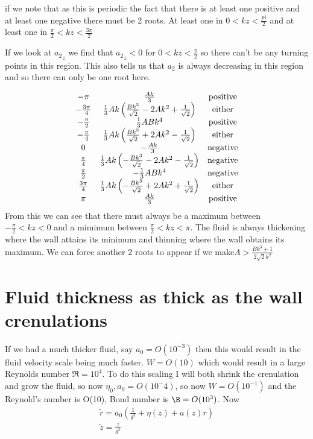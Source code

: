 \documentclass[12pt]{article}
\begin{document}
if we note that as this is periodic the fact that there is at least one positive and at least one negative there must be 2 roots. At least one in $0<kz<\frac{pi}{2}$ and at least one in $ \frac{\pi}{2}<kz<\frac{3\pi}{2}$

If we look at ${a_2}_z$ we find that ${a_2}_z<0 $ for $0<kz<\frac{\pi}{2}$ so there can't be any turning points in this region. This also tells us that $a_2$ is always decreasing in this region and so there can only be one root here.

\begin{align}
\begin{array}{cc c}
-\pi  & \frac{A k}{3}&\mathrm{positive} \\
-\frac{3 \pi }{4} & \frac{1}{3} A k \left(\frac{B k^3}{\sqrt{2}}-2 A
k^2+\frac{1}{\sqrt{2}}\right) &\mathrm{either}\\
-\frac{\pi }{2} & \frac{1}{3} A B k^4 &\mathrm{positive}\\
-\frac{\pi }{4} & \frac{1}{3} A k \left(\frac{B k^3}{\sqrt{2}}+2 A
k^2-\frac{1}{\sqrt{2}}\right)& \mathrm{either}\\
0 & -\frac{A k}{3} &\mathrm{negative}\\
\frac{\pi }{4} & \frac{1}{3} A k \left(-\frac{B k^3}{\sqrt{2}}-2 A
k^2-\frac{1}{\sqrt{2}}\right) &\mathrm{negative}\\
\frac{\pi }{2} & -\frac{1}{3} A B k^4 &\mathrm{negative}\\
\frac{3 \pi }{4} & \frac{1}{3} A k \left(-\frac{B k^3}{\sqrt{2}}+2 A
k^2+\frac{1}{\sqrt{2}}\right)& \mathrm{either}\\
\pi  & \frac{A k}{3} &\mathrm{positive}\\
\end{array}
\end{align}
From this we can see that there must always be a maximum between $-\frac{\pi}{2}<kz<0$ and a mimimum between $\frac{\pi}{2}<kz<\pi$. The fluid is always thickening where the wall attains its minimum and thinning where the wall obtains its maximum. We can force another 2 roots to appear if we make$ A > \frac{Bk^3+1}{2\sqrt{2}k^2}$ 
\section{Fluid thickness as thick as the wall crenulations}
If we had a much thicker fluid, say $a_0 = O(10^{-3})$ then this would result in the fluid velocity scale being much faster. $W = O(10)$ which would result in a large Reynolds number $\Re = 10^4$. To do this scaling I will both shrink the crenulation and grow the fluid, so now $\eta_0, a_0 = O(10^-4)$, so now $W= O(10^{-1})$ and the Reynold's number is O(10), Bond number is $\B = O(10^3)$. Now 
\begin{align} 
\tilde{r} = a_0\left(\frac{1}{\delta^3}+\eta(z) +a(z)r\right)\\
\tilde{z} = \frac{z}{\delta^2}
\end{align}
\end{document}
